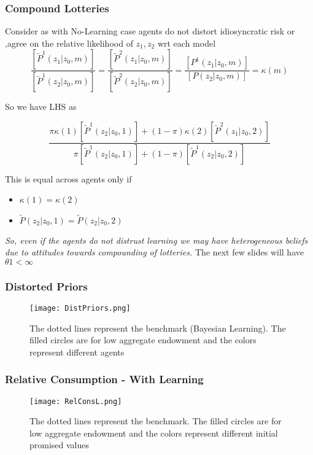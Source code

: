 \documentclass{beamer}
\theoremstyle{Definition}
\begin{document}
 \begin{frame}
\frametitle{Compound Lotteries}
Consider as with No-Learning case agents do not distort idiosyncratic risk or ,agree on the relative likelihood of $z_1,z_2$ wrt each model
\[\frac{[\tilde{P}^1(z_1|z_0,m)]}{[\tilde{P}^1(z_2|z_0,m)]}= \frac{[\tilde{P}^2(z_1|z_0,m)]}{[\tilde{P}^2(z_2|z_0,m)]}=\frac{[P^1(z_1|z_0,m)]}{[P(z_2|z_0,m)]}=\kappa(m)\]

So we have LHS as

\scriptsize{
\[\frac{\pi\kappa(1)[\tilde{P}^1(z_2 |z_0,1)]+(1-\pi)\kappa(2)[\tilde{P}^2(z_1 | z_0,2)]}{\pi[\tilde{P}^1(z_2 |z_0,1)]+(1-\pi)[\tilde{P}^1(z_2 | z_0,2)]}\]
}

This is equal across agents only if 
\begin{itemize}
	\item $\kappa(1)=\kappa(2)$
	\item $\tilde{P}(z_2 | z_0,1)=\tilde{P}(z_2 | z_0,2)$
\end{itemize}

\emph{So, even if the agents do not distrust learning we may have heterogeneous beliefs due to attitudes towards compounding of lotteries.}
The next few slides will have $\theta1 <\infty$
  \end{frame} 
  \begin{frame}
\frametitle{Distorted Priors}
 \begin{figure}
 {\texttt{[image: DistPriors.png]}}
 \caption{\tiny{The dotted lines represent the benchmark (Bayesian Learning). The filled circles are for low aggregate endowment and the colors represent different agents}}
  \end{figure}
	
 
 
  \end{frame}

\begin{frame}
\frametitle{Relative Consumption - With Learning}
\begin{figure}
 {\texttt{[image: RelConsL.png]}}
 \caption{\tiny{The dotted lines represent the benchmark. The filled circles are for low aggregate endowment and the colors represent different initial promised values}}
  \end{figure}
	
 
 
  \end{frame}
  
\end{document}
